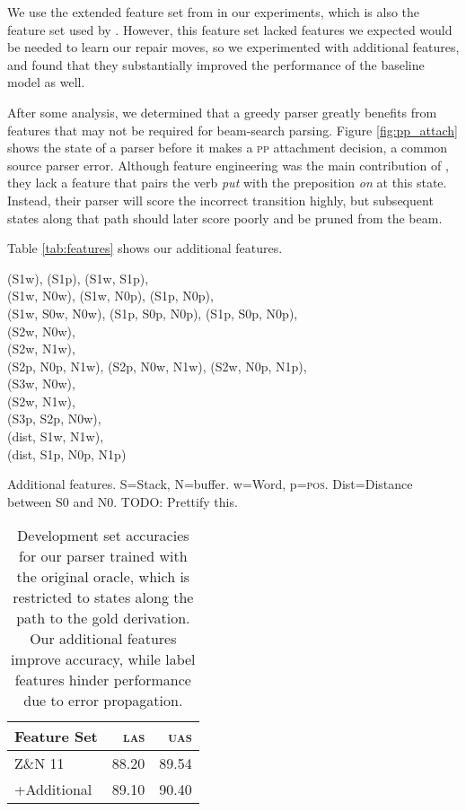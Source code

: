 \documentclass[11pt,letterpaper]{article}
\newcommand{\las}{\textsc{las}\xspace}
\newcommand{\uas}{\textsc{uas}\xspace}
\newcommand{\pp}{\textsc{pp}\xspace}
\newcommand{\pos}{\textsc{pos}\xspace}
\begin{document}
We use the extended feature set from \citet{zhang:11} in our experiments, which
is also the feature set used by \citet{goldberg:12}. However, this feature set
lacked features we expected would be needed to learn our repair moves, so we
experimented with additional features, and found that they substantially improved
the performance of the baseline model as well.

After some analysis, we determined that a greedy parser greatly benefits from
features that may not be required for beam-search parsing. 
Figure \ref{fig:pp_attach} shows the state of a parser before
it makes a \pp attachment decision, a common source parser error. Although
feature engineering was the
main contribution of \citet{zhang:11}, they lack a feature that pairs the verb
\emph{put} with the preposition \emph{on} at this state. Instead, their parser will
score the incorrect transition highly, but subsequent states along that path should
later score poorly and be pruned from the beam.

Table \ref{tab:features} shows our additional features. 
\begin{table}
    \small
    
    \centering
    (S1w), (S1p), (S1w, S1p),\\
    (S1w, N0w), (S1w, N0p), (S1p, N0p),\\
    (S1w, S0w, N0w), (S1p, S0p, N0p), (S1p, S0p, N0p),\\
    (S2w, N0w),\\
    (S2w, N1w),\\
    (S2p, N0p, N1w), (S2p, N0w, N1w), (S2w, N0p, N1p), \\
    (S3w, N0w), \\
    (S2w, N1w),\\ 
    (S3p, S2p, N0w),\\
    (dist, S1w, N1w),\\
    (dist, S1p, N0p, N1p)
\caption{Additional features. S=Stack, N=buffer. w=Word, p=\pos. Dist=Distance
         between S0 and N0. TODO: Prettify this.}
\end{table}

\begin{table}
    \centering
    \begin{tabular}{l|rr}
        \hline 
        Feature Set & \las  & \uas  \\
        \hline \hline
        Z\&N 11  & 88.20 & 89.54 \\
+Additional      & 89.10 & 90.40 \\
    \hline
    \end{tabular}
    \caption{Development set accuracies for our parser trained
             with the original oracle, which is restricted
             to states along the path to the gold derivation.
             Our additional features improve accuracy, while label
         features hinder performance due to error propagation.\label{tab:feats}}
\end{table}
\end{document}
